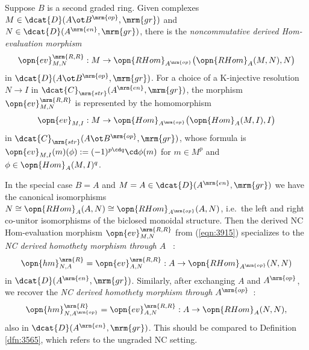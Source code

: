 Suppose $B$ is a second graded ring. Given complexes
$M \in \dcat{D}(A \ot B^{\mrm{op}}, \mrm{gr})$ and 
$N \in \dcat{D}(A^{\mrm{en}}, \mrm{gr})$, 
there is the 
{\em noncommutative derived Hom-evaluation morphism}%
%
\begin{equation} \label{eqn:3915}
\opn{ev}^{\mrm{R, R}}_{M, N} : M \to 
\opn{RHom}_{A^{\mrm{op}}} \bigl( \opn{RHom}_{A}(M, N), N \bigr) 
\end{equation}
in $\dcat{D}(A \ot B^{\mrm{op}}, \mrm{gr})$.
For a choice of a K-injective resolution 
$N \to I$ in $\dcat{C}_{\mrm{str}}(A^{\mrm{en}}, \mrm{gr})$,
the morphism $\opn{ev}^{\mrm{R, R}}_{M, N}$ 
is represented by the homomorphism 
\[ \opn{ev}_{M, I} : 
M \to \opn{Hom}_{A^{\mrm{op}}} \bigl( \opn{Hom}_{A}(M, I), I \bigr) \]
in $\dcat{C}_{\mrm{str}}(A \ot B^{\mrm{op}}, \mrm{gr})$, 
whose formula is 
$\opn{ev}_{M, I}(m)(\phi) := (-1)^{p \cd q} \cd \phi(m)$
for $m \in M^p$ and $\phi \in \opn{Hom}_{A}(M, I)^q$. 

In the special case $B = A$ and 
$M = A \in \dcat{D}(A^{\mrm{en}}, \mrm{gr})$
we have the canonical isomorphisms 
$N \cong \opn{RHom}_{A}(A, N) \cong \opn{RHom}_{A^{\mrm{op}}}(A, N)$,
i.e.\ the left and right co-unitor isomorphisms of the biclosed monoidal 
structure. Then the derived NC Hom-evaluation morphism 
$\opn{ev}^{\mrm{R, R}}_{M, N}$ from (\ref{eqn:3915}) specializes to the 
{\em NC derived homothety morphism through $A$}%
%
~:
\begin{equation} \label{eqn:3916}
\opn{hm}^{\mrm{R}}_{N, A}
= \opn{ev}^{\mrm{R, R}}_{A, N} : A \to \opn{RHom}_{A^{\mrm{op}}}(N, N) 
\end{equation}
in $\dcat{D}(A^{\mrm{en}}, \mrm{gr})$.
Similarly, after exchanging $A$ and $A^{\mrm{op}}$, we recover 
the {\em NC derived homothety morphism through $A^{\mrm{op}}$}~:
\begin{equation} \label{eqn:3917}
\opn{hm}^{\mrm{R}}_{N, A^{\mrm{op}}} =
\opn{ev}^{\mrm{R, R}}_{A, N} : A \to \opn{RHom}_{A}(N, N) ,
\end{equation}
also in $\dcat{D}(A^{\mrm{en}}, \mrm{gr})$.
This should be compared to Definition \ref{dfn:3565}, which refers to the 
ungraded NC setting. 

